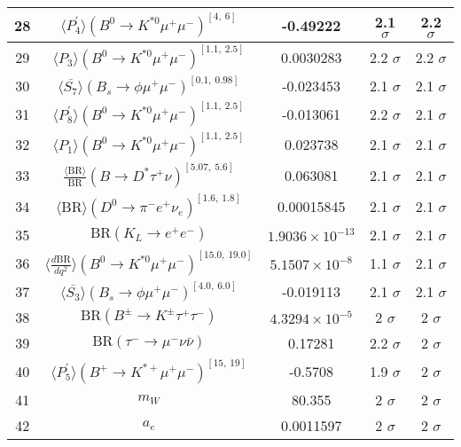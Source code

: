 \begin{longtable}{|c|c|c|c|c|}
28 &	 $\langle P_4^\prime\rangle(B^0\to K^{\ast 0}\mu^+\mu^-)^{[4,\  6]}$ &	 -0.49222 &	 \cellcolor{green!4}2.1 $ \sigma$ &	 2.2 $ \sigma$ \\ \hline
29 &	 $\langle P_3\rangle(B^0\to K^{\ast 0}\mu^+\mu^-)^{[1.1,\  2.5]}$ &	 0.0030283 &	 \cellcolor{red!0}2.2 $ \sigma$ &	 2.2 $ \sigma$ \\ \hline
30 &	 $\langle \overline{S_7}\rangle(B_s\to \phi \mu^+\mu^-)^{[0.1,\  0.98]}$ &	 -0.023453 &	 \cellcolor{green!0}2.1 $ \sigma$ &	 2.1 $ \sigma$ \\ \hline
31 &	 $\langle P_8^\prime\rangle(B^0\to K^{\ast 0}\mu^+\mu^-)^{[1.1,\  2.5]}$ &	 -0.013061 &	 \cellcolor{red!1}2.2 $ \sigma$ &	 2.1 $ \sigma$ \\ \hline
32 &	 $\langle P_1\rangle(B^0\to K^{\ast 0}\mu^+\mu^-)^{[1.1,\  2.5]}$ &	 0.023738 &	 \cellcolor{green!0}2.1 $ \sigma$ &	 2.1 $ \sigma$ \\ \hline
33 &	 $\frac{\langle \mathrm{BR} \rangle}{\mathrm{BR}}(B\to D^\ast\tau^+\nu)^{[5.07,\  5.6]}$ &	 0.063081 &	 \cellcolor{green!0}2.1 $ \sigma$ &	 2.1 $ \sigma$ \\ \hline
34 &	 $\langle\mathrm{BR}\rangle(D^0\to \pi^- e^+\nu_e)^{[1.6,\  1.8]}$ &	 0.00015845 &	 \cellcolor{red!0}2.1 $ \sigma$ &	 2.1 $ \sigma$ \\ \hline
35 &	 $\mathrm{BR}(K_L\to e^+e^-)$ &	 $1.9036\times 10^{-13}$ &	 \cellcolor{green!0}2.1 $ \sigma$ &	 2.1 $ \sigma$ \\ \hline
36 &	 $\langle \frac{d\mathrm{BR}}{dq^2} \rangle(B^0\to K^{\ast 0}\mu^+\mu^-)^{[15.0,\  19.0]}$ &	 $5.1507\times 10^{-8}$ &	 \cellcolor{green!49}1.1 $ \sigma$ &	 2.1 $ \sigma$ \\ \hline
37 &	 $\langle \overline{S_3}\rangle(B_s\to \phi \mu^+\mu^-)^{[4.0,\  6.0]}$ &	 -0.019113 &	 \cellcolor{red!0}2.1 $ \sigma$ &	 2.1 $ \sigma$ \\ \hline
38 &	 $\mathrm{BR}(B^\pm\to K^\pm \tau^+\tau^-)$ &	 $4.3294\times 10^{-5}$ &	 \cellcolor{green!3}2 $ \sigma$ &	 2 $ \sigma$ \\ \hline
39 &	 $\mathrm{BR}(\tau^-\to \mu^- \nu\bar\nu)$ &	 0.17281 &	 \cellcolor{red!8}2.2 $ \sigma$ &	 2 $ \sigma$ \\ \hline
40 &	 $\langle P_5^\prime\rangle(B^+\to K^{\ast +}\mu^+\mu^-)^{[15,\  19]}$ &	 -0.5708 &	 \cellcolor{green!6}1.9 $ \sigma$ &	 2 $ \sigma$ \\ \hline
41 &	 $m_W$ &	 80.355 &	 2 $ \sigma$ &	 2 $ \sigma$ \\ \hline
42 &	 $a_e$ &	 0.0011597 &	 2 $ \sigma$ &	 2 $ \sigma$ \\ \hline

\end{longtable}
